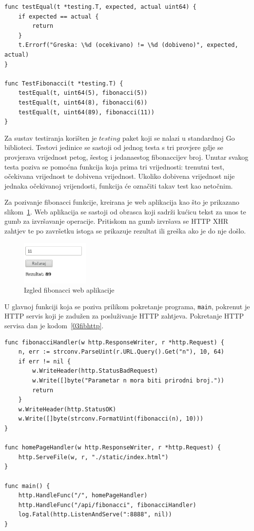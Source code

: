 \begin{lstlisting}[float=h]
func testEqual(t *testing.T, expected, actual uint64) {
	if expected == actual {
		return
	}
	t.Errorf("Greska: \%d (ocekivano) != \%d (dobiveno)", expected, actual)
}

func TestFibonacci(t *testing.T) {
	testEqual(t, uint64(5), fibonacci(5))
	testEqual(t, uint64(8), fibonacci(6))
	testEqual(t, uint64(89), fibonacci(11))
}

\end{lstlisting}

Za sustav testiranja korišten je $testing$ paket koji se nalazi u standardnoj Go biblioteci. Testovi
jedinice se sastoji od jednog testa s tri provjere gdje se provjerava vrijednost petog, šestog i
jedanaestog fibonaccijev broj.  Unutar svakog testa poziva se pomoćna funkcija koja prima tri
vrijednosti: trenutni test, očekivana vrijednost te dobivena vrijednost. Ukoliko dobivena vrijednost
nije jednaka očekivanoj vrijendosti, funkcija će označiti takav test kao netočnim.

Za pozivanje fibonacci funkcije, kreirana je web aplikacija kao što je prikazano
slikom~\ref{fig:03fibv1png}. Web aplikacija se sastoji od obrasca koji sadrži kućicu tekst za unos
te gumb za izvršavanje operacije. Pritiskom na gumb izvršava se HTTP XHR zahtjev te po završetku
istoga se prikazuje rezultat ili greška ako je do nje došlo.

\begin{figure}[h]
    \centering
    \includegraphics[width=0.3\textwidth]{img/03/fibonacci_html.png}
    \caption{Izgled fibonacci web aplikacije}%
    \label{fig:03fibv1png}
\end{figure}

U glavnoj funkciji koja se poziva prilikom pokretanje programa, \texttt{main}, pokrenut je HTTP
servis koji je zadužen za posluživanje HTTP zahtjeva. Pokretanje HTTP servisa dan je
kodom~\ref{03fibhttp}.

\begin{lstlisting}[float=h]
func fibonacciHandler(w http.ResponseWriter, r *http.Request) {
	n, err := strconv.ParseUint(r.URL.Query().Get("n"), 10, 64)
	if err != nil {
		w.WriteHeader(http.StatusBadRequest)
		w.Write([]byte("Parametar n mora biti prirodni broj."))
		return
	}
	w.WriteHeader(http.StatusOK)
	w.Write([]byte(strconv.FormatUint(fibonacci(n), 10)))
}

func homePageHandler(w http.ResponseWriter, r *http.Request) {
	http.ServeFile(w, r, "./static/index.html")
}

func main() {
	http.HandleFunc("/", homePageHandler)
	http.HandleFunc("/api/fibonacci", fibonacciHandler)
	log.Fatal(http.ListenAndServe(":8888", nil))
}
\end{lstlisting}

